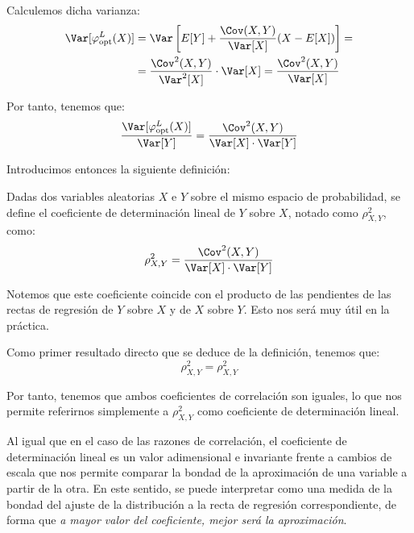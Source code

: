 Calculemos dicha varianza:
\begin{align*}
    \Var[\varphi_{\text{opt}}^L(X)] &= \Var\left[E[Y] + \dfrac{\Cov(X,Y)}{\Var[X]}(X - E[X])\right]
    =\\&=
    \dfrac{\Cov^2(X,Y)}{\Var^2[X]}\cdot \Var[X]= \dfrac{\Cov^2(X,Y)}{\Var[X]}
\end{align*}

Por tanto, tenemos que:
\begin{equation*}
    \dfrac{\Var[\varphi_{\text{opt}}^L(X)]}{\Var[Y]} = \dfrac{\Cov^2(X,Y)}{\Var[X]\cdot \Var[Y]}
\end{equation*}

Introducimos entonces la siguiente definición:
\begin{definicion}
    Dadas dos variables aleatorias $X$ e $Y$ sobre el mismo espacio de probabilidad, se define el coeficiente de determinación lineal de $Y$ sobre $X$, notado como $\rho^2_{X,Y}$, como:
    \begin{equation*}
        \rho^2_{X,Y} = \dfrac{\Cov^2(X,Y)}{\Var[X]\cdot \Var[Y]}
    \end{equation*}
\end{definicion}
\begin{observacion}
    Notemos que este coeficiente coincide con el producto de las pendientes de las rectas de regresión de $Y$ sobre $X$ y de $X$ sobre $Y$. Esto nos será muy útil en la práctica.
\end{observacion}

Como primer resultado directo que se deduce de la definición, tenemos que:
\begin{equation*}
    \rho^2_{X,Y} = \rho^2_{X,Y}
\end{equation*}

Por tanto, tenemos que ambos coeficientes de correlación son iguales, lo que nos permite referirnos simplemente a $\rho^2_{X,Y}$ como coeficiente de determinación lineal.

Al igual que en el caso de las razones de correlación, el coeficiente de determinación lineal es un valor adimensional e invariante frente a cambios de escala que nos permite comparar la bondad de la aproximación de una variable a partir de la otra. En este sentido, se puede interpretar como una medida de la bondad del ajuste de la distribución a la recta de regresión correspondiente, de forma que \emph{a mayor valor del coeficiente, mejor será la aproximación}.

